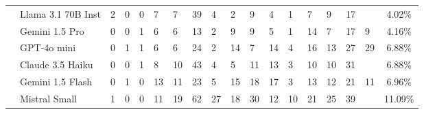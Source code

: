 \begin{table*}[t]
\begin{tabular}{l|p{0.45cm}p{0.45cm}p{0.45cm}p{0.45cm}p{0.45cm}p{0.45cm}|p{0.45cm}p{0.45cm}p{0.45cm}|l|p{0.45cm}p{0.45cm}p{0.45cm}|l|p{0.45cm}|c}
\ \ Llama 3.1 70B Inst & \cellcolor{ReliableYellow}2 & \cellcolor{ReliableGreen}0 & \cellcolor{ReliableGreen}0 & \cellcolor{ReliableOrange}7 & \cellcolor{ReliableOrange}7 & 39 & \cellcolor{ReliableYellow}4 & \cellcolor{ReliableYellow}2 & \cellcolor{ReliableOrange}9 & \cellcolor{ReliableOrange}4 & \cellcolor{ReliableYellow}1 & \cellcolor{ReliableOrange}7 & \cellcolor{ReliableOrange}9 & 17 &  & \cellcolor{ReliableGray}4.02\% \\
\ \ Gemini 1.5 Pro & \cellcolor{ReliableGreen}0 & \cellcolor{ReliableGreen}0 & \cellcolor{ReliableYellow}1 & \cellcolor{ReliableOrange}6 & \cellcolor{ReliableOrange}6 & \cellcolor{ReliableOrange}13 & \cellcolor{ReliableYellow}2 & \cellcolor{ReliableOrange}9 & \cellcolor{ReliableOrange}9 & \cellcolor{ReliableOrange}5 & \cellcolor{ReliableYellow}1 & 14 & \cellcolor{ReliableOrange}7 & 17 & \cellcolor{ReliableOrange}9 & \cellcolor{ReliableGray}4.16\% \\
\ \ GPT-4o mini & \cellcolor{ReliableGreen}0 & \cellcolor{ReliableYellow}1 & \cellcolor{ReliableYellow}1 & \cellcolor{ReliableOrange}6 & \cellcolor{ReliableOrange}6 & 24 & \cellcolor{ReliableYellow}2 & 14 & \cellcolor{ReliableOrange}7 & 14 & \cellcolor{ReliableOrange}4 & 16 & 13 & 27 & 29 & \cellcolor{ReliableGray}6.88\% \\
\ \ Claude 3.5 Haiku & \cellcolor{ReliableGreen}0 & \cellcolor{ReliableGreen}0 & \cellcolor{ReliableYellow}1 & \cellcolor{ReliableOrange}8 & \cellcolor{ReliableOrange}10 & 43 & \cellcolor{ReliableYellow}4 & \cellcolor{ReliableOrange}5 & 11 & 13 & \cellcolor{ReliableYellow}3 & 10 & \cellcolor{ReliableOrange}10 & 31 &  & \cellcolor{ReliableGray}6.88\% \\
\ \ Gemini 1.5 Flash & \cellcolor{ReliableGreen}0 & \cellcolor{ReliableYellow}1 & \cellcolor{ReliableGreen}0 & \cellcolor{ReliableOrange}13 & \cellcolor{ReliableOrange}11 & 23 & \cellcolor{ReliableOrange}5 & 15 & 18 & 17 & \cellcolor{ReliableYellow}3 & 13 & 12 & 21 & \cellcolor{ReliableOrange}11 & \cellcolor{ReliableGray}6.96\% \\
\ \ Mistral Small & \cellcolor{ReliableYellow}1 & \cellcolor{ReliableGreen}0 & \cellcolor{ReliableGreen}0 & \cellcolor{ReliableOrange}11 & 19 & 62 & 27 & 18 & 30 & 12 & 10 & 21 & 25 & 39 &  & \cellcolor{ReliableGray}11.09\% \\
    \bottomrule
    \end{tabular}
    \vspace{-2pt}

\end{table*}
